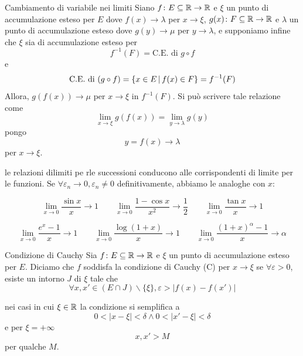 \documentclass[a4paper]{article}
\begin{document}
\begin{snippettheorem}{Cambiamento di variabile nei limiti}
    Siano \(f\colon E \subseteq \mathbb{R} \to \mathbb{R}\) e
    \(\xi\) un punto di accumulazione esteso per \(E\) dove \(f(x) \to \lambda\)
    per \(x\to\xi\), \(g(x) \colon F \subseteq \mathbb{R} \to \mathbb{R}\)
    e \(\lambda\) un punto di accumulazione esteso dove \(g(y) \to \mu\) per \(y\to\lambda\),
    e supponiamo infine che \(\xi\) sia di accumulazione esteso per
    \[
        f^{-1}(F) = \text{C.E. di } g\circ f
    \]
    e
    \[
        \text{C.E. di } (g\circ f) = \{x \in E \,|\, f(x) \in F\} = f^{-1}(F)
    \]
    Allora, \(g(f(x)) \to \mu\) per \(x\to\xi\) in \(f^{-1}(F)\).
    Si può scrivere tale relazione come
    \[
        \lim_{x\to\xi}g(f(x)) = \lim_{y\to\lambda} g(y)
    \]
    pongo
    \[
        y = f(x) \to \lambda
    \]
    per \(x\to\xi\).
\end{snippettheorem}

le relazioni dilimiti pe rle successioni conducono alle corrispondenti
di limite per le funzioni.
Se \(\forall \varepsilon_n \to 0, \varepsilon_n \neq 0\) definitivamente, abbiamo le analoghe con \(x\):
\begin{center}
    \[
    \lim_{x\to 0} \frac{\sin x}{x} \to 1 \qquad
    \lim_{x\to 0} \frac{1-\cos x}{x^2} \to \frac{1}{2} \qquad
    \lim_{x\to 0} \frac{\tan x}{x} \to 1
    \]
\end{center}
\begin{center}
    \[
    \lim_{x\to 0} \frac{e^x - 1}{x} \to 1 \qquad
    \lim_{x\to 0} \frac{\log(1+x)}{x} \to 1 \qquad
    \lim_{x\to 0} \frac{{(1+x)}^\alpha - 1}{x} \to \alpha
    \]
\end{center}

\begin{radioactive}
\begin{snippetdefinition}{Condizione di Cauchy}
    Sia \(f \colon E \subseteq \mathbb{R} \to \mathbb{R}\)
    e \(\xi\) un punto di accumulazione esteso per \(E\).
    Diciamo che \(f\) soddisfa la condizione di Cauchy (C)
    per \(x\to\xi\) se \(\forall \varepsilon> 0\), esiste un intorno \(J\)
    di \(\xi\) tale che \[\forall x,x'\in (E\cap J) \backslash \{\xi\}, \varepsilon > |f(x) - f(x')|\]
\end{snippetdefinition}

nei casi in cui \(\xi \in \mathbb{R}\) la condizione si semplifica a
\[
    0 < |x-\xi|<\delta \land 0 < |x'-\xi|<\delta
\]
e per \(\xi = +\infty\)
\[
    x,x' > M
\]
per qualche \(M\).
\end{radioactive}
\end{document}
